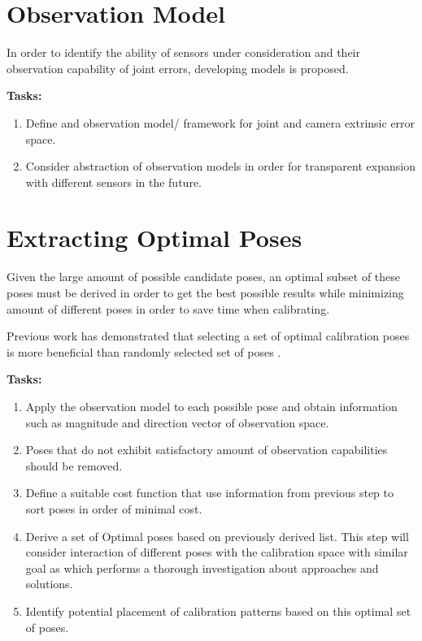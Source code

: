\documentclass[english, printversion, nomenclature, notitle]{tuvisionthesis} %
\begin{document}
\section{Observation Model}
In order to identify the ability of sensors under consideration and their observation capability of joint errors, developing  models is proposed.

\textbf{Tasks:}
\begin{enumerate}
	\item Define and observation model/ framework for joint and camera extrinsic error space.
	\item Consider abstraction of observation models in order for transparent expansion with different sensors in the future.
\end{enumerate}

\section{Extracting Optimal Poses}
Given the large amount of possible candidate poses, an optimal subset of these poses must be derived in order to get the best possible results while minimizing amount of different poses in order to save time when calibrating.

Previous work has demonstrated that selecting a set of optimal calibration poses is more beneficial than randomly selected set of poses \cite{khalil_identifiable_1991, zhou_selecting_2014, borm_experimental_nodate, sun2008observability}.

\textbf{Tasks:}
\begin{enumerate}
	\item Apply the observation model to each possible pose and obtain information such as magnitude and direction vector of observation space.
	\item Poses that do not exhibit satisfactory amount of observation capabilities should be removed.
	\item Define a suitable cost function that use information from previous step to sort poses in order of minimal cost.
	\item Derive a set of Optimal poses based on previously derived list. This step will consider interaction of different poses with the calibration space with similar goal as \cite{WU2015151} which performs a thorough investigation about approaches and solutions.
	\item Identify potential placement of calibration patterns based on this optimal set of poses.
\end{enumerate}
\end{document}
